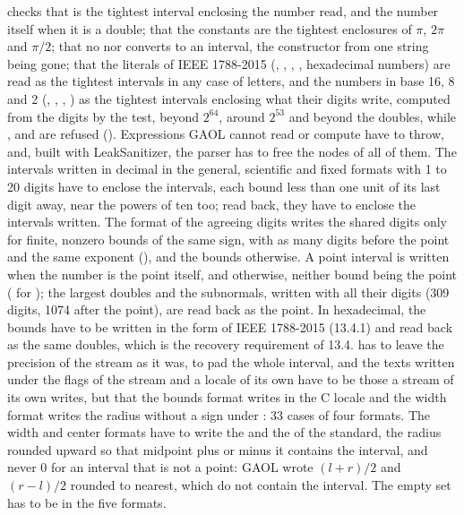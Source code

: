 \documentclass[12pt,a4paper,twoside,openright]{book}
\begin{document}
 checks that  is the tightest
interval enclosing the number read, and the number itself when it is a
double; that the constants are the tightest enclosures of $\pi$, $2\pi$ and
$\pi/2$; that no  nor  converts to an
interval, the constructor from one string being gone;\newinvfive{} that the
literals of IEEE 1788-2015 (\code{[entire]}, \code{[ ]}, \code{[1,]},
, hexadecimal numbers) are read as the tightest intervals in
any case of letters, and the numbers in base 16, 8 and 2 (,
, , ) as the tightest intervals
enclosing what their digits write, computed from the digits by the test,
beyond $2^{64}$, around $2^{53}$ and beyond the doubles, while ,
 and  are refused ().
Expressions GAOL cannot read or compute have to throw, and, built with
LeakSanitizer, the parser has to free the nodes of all of them. The
intervals written in decimal in the general, scientific and fixed formats
with 1 to 20 digits have to enclose the intervals, each bound less than one
unit of its last digit away, near the powers of ten too; read back, they
have to enclose the intervals written. The format of the agreeing digits
writes the shared digits only for finite, nonzero bounds of the same sign,
with as many digits before the point and the same exponent
(\code{-1.25\textasciitilde[67, 0]}), and the bounds otherwise. A point
interval is written \code{[a]} when the number is the point itself, and
\code{[l, r]} otherwise, neither bound being the point
(\code{[0.1, 0.1000000000000001]} for ); the largest
doubles and the subnormals, written with all their digits (309 digits, 1074
after the point), are read back as the point.\newinvfive{} In hexadecimal,
the bounds have to be written in the form of IEEE 1788-2015 (13.4.1) and
read back as the same doubles, which is the recovery requirement of 13.4.
 has to leave the precision of the stream as it was,
 to pad the whole interval, and the texts written under the
flags of the stream and a locale of its own have to be those a stream of its
own writes, but that the bounds format writes in the C locale and the width
format writes the radius without a sign under : 33 cases of
four formats. The width and center formats have to write the
 and the  of the standard, the radius rounded
upward so that midpoint plus or minus it contains the interval, and never 0
for an interval that is not a point: GAOL wrote $(l+r)/2$ and $(r-l)/2$
rounded to nearest, which do not contain the interval.\newinvfive{} The
empty set has to be \code{[empty]} in the five formats.
\end{document}
